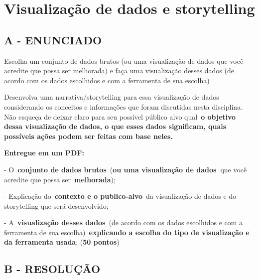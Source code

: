 \label{ap:ap14}
\chapter{Visualização de dados e storytelling}
\section*{\textbf{A - ENUNCIADO}}

\textcolor[HTML]{1D2125}{Escolha um conjunto de dados brutos (ou uma visualização de dados que você acredite que possa
ser melhorada) e faça uma visualização desses dados (de acordo com os dados escolhidos e com a ferramenta de sua
escolha)}

\textcolor[HTML]{1D2125}{Desenvolva uma narrativa/storytelling para essa visualização de dados considerando os conceitos
e informações que foram discutidas nesta disciplina. Não esqueça de deixar claro para seu possível público alvo
qual }\textbf{\textcolor[HTML]{1D2125}{o objetivo dessa visualização de dados, o que esses dados significam, quais
possíveis ações podem ser feitas com base neles.}}\textcolor[HTML]{1D2125}{ }

\textbf{\textcolor[HTML]{1D2125}{Entregue em um PDF:}}

\textcolor[HTML]{1D2125}{{}- O }\textbf{\textcolor[HTML]{1D2125}{conjunto de dados
brutos}}\textcolor[HTML]{1D2125}{ (}\textbf{\textcolor[HTML]{1D2125}{ou uma visualização de
dados }}\textcolor[HTML]{1D2125}{que você acredite que possa
ser }\textbf{\textcolor[HTML]{1D2125}{melhorada}}\textcolor[HTML]{1D2125}{);}

\textcolor[HTML]{1D2125}{{}- Explicação do }\textbf{\textcolor[HTML]{1D2125}{contexto e o
publico-alvo}}\textcolor[HTML]{1D2125}{ da visualização de dados e do storytelling que será desenvolvido;}

\textcolor[HTML]{1D2125}{{}- A }\textbf{\textcolor[HTML]{1D2125}{visualização desses
dados}}\textcolor[HTML]{1D2125}{ (de acordo com os dados escolhidos e com a ferramenta de sua
escolha) }\textbf{\textcolor[HTML]{1D2125}{explicando a escolha do tipo de visualização e da ferramenta
usada}}\textcolor[HTML]{1D2125}{; (}\textbf{\textcolor[HTML]{1D2125}{50 pontos}}\textcolor[HTML]{1D2125}{)}



\section*{\textbf{B - RESOLUÇÃO}}
\lipsum[30]